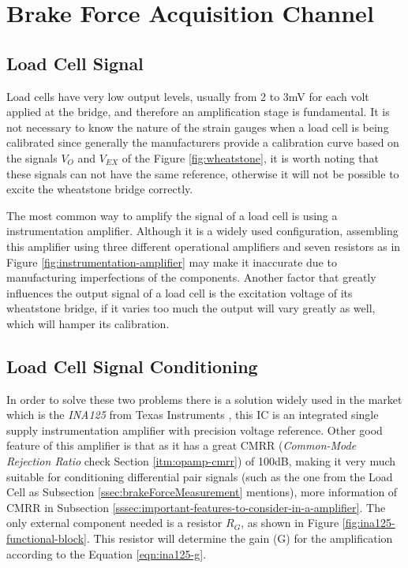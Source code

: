\section{Brake Force Acquisition Channel}\label{sec:brake-pressure-acquisition-channel}

\subsection{Load Cell Signal}\label{ssec:load-cell-signal}

	Load cells have very low output levels, usually from 2 to 3mV for each volt applied at the bridge, and therefore an amplification stage is fundamental. It is not necessary to know the nature of the strain gauges when a load cell is being calibrated since generally the manufacturers provide a calibration curve based on the signals $V_{O}$ and $V_{EX}$ of the Figure \ref{fig:wheatstone}, it is worth noting that these signals can not have the same reference, otherwise it will not be possible to excite the wheatstone bridge correctly.
	\par
	The most common way to amplify the signal of a load cell is using a instrumentation amplifier. Although it is a widely used configuration, assembling this amplifier using three different operational amplifiers and seven resistors as in Figure \ref{fig:instrumentation-amplifier} may make it inaccurate due to manufacturing imperfections of the components. Another factor that greatly influences the output signal of a load cell is the excitation voltage of its wheatstone bridge, if it varies too much the output will vary greatly as well, which will hamper its calibration.

\subsection{Load Cell Signal Conditioning}\label{ssec:load-cell-signal-conditioning}
		
	In order to solve these two problems there is a solution widely used in the market which is the \textit{INA125} from Texas Instruments \cite{ina125}, this IC is an integrated single supply instrumentation amplifier with precision voltage reference. Other good feature of this amplifier is that as it has a great CMRR (\textit{Common-Mode Rejection Ratio} check Section \ref{itm:opamp-cmrr}) of 100dB, making it very much suitable for conditioning differential pair signals (such as the one from the Load Cell as Subsection \ref{ssec:brakeForceMeasurement} mentions), more information of CMRR in Subsection \ref{sssec:important-features-to-consider-in-a-amplifier}. The only external component needed is a resistor $R_{G}$, as shown in Figure \ref{fig:ina125-functional-block}. This resistor will determine the gain (G) for the amplification according to the Equation \ref{eqn:ina125-g}.
	

